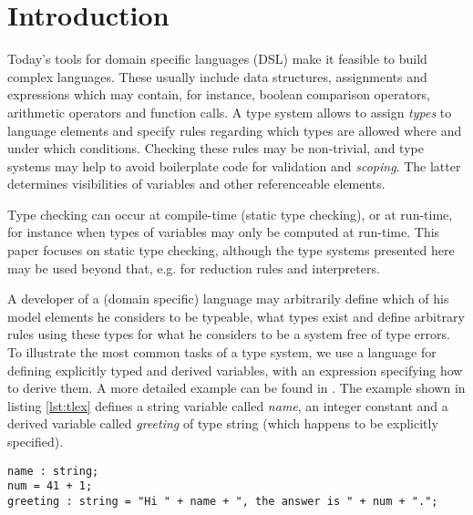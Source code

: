 \section{Introduction}

Today's tools for domain specific languages (DSL) make it feasible to build
complex languages. These usually include data structures, assignments and
expressions which may contain, for instance, boolean comparison operators,
arithmetic operators and function calls. A type system allows to assign
\emph{types} to language elements and specify rules regarding which types are
allowed where and under which conditions. Checking these rules may be
non-trivial, and type systems may help to avoid boilerplate code for validation
and \emph{scoping}. The latter determines visibilities of variables and other
referenceable elements.

Type checking can occur at compile-time (static type checking), or
at run-time, for instance when types of variables may only be computed at
run-time. This paper focuses on static type checking, although the type systems
presented here may be used beyond that, e.g. for reduction rules and
interpreters.

A developer of a (domain specific) language may arbitrarily define which of his
model elements he considers to be typeable, what types exist and define
arbitrary rules using these types for what he considers to be a system free of
type errors.
To illustrate the most common tasks of a type system, we use a language for
defining explicitly typed and derived variables, with an expression specifying
how to derive them. A more detailed example can be found in \cite{mvdsl}. The
example shown in listing \ref{lst:tlex} defines a string variable called
\emph{name}, an integer constant and a derived variable called \emph{greeting}
of type string (which happens to be explicitly specified).

\begin{lstlisting}[float,label=lst:tlex,caption=Example for a typed language.]
name : string;
num = 41 + 1;
greeting : string = "Hi " + name + ", the answer is " + num + ".";
\end{lstlisting}

